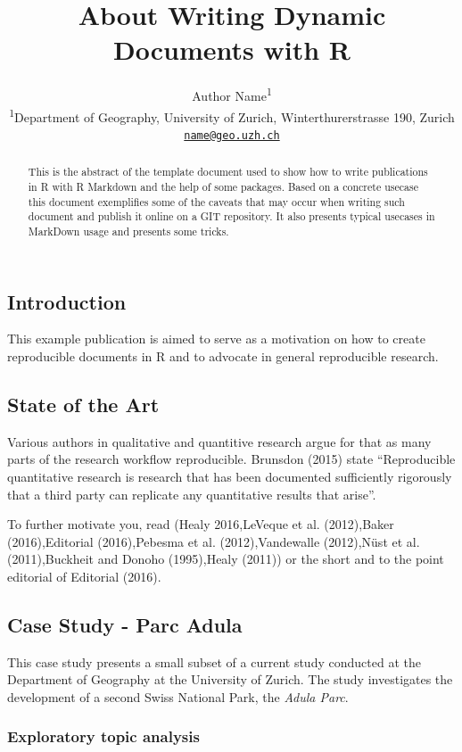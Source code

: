 \documentclass[]{article}
\title{About Writing Dynamic Documents with R}
\author{Author Name\textsuperscript{1} \\ \textsuperscript{1}Department of Geography, University of Zurich,
Winterthurerstrasse 190, Zurich \\ \href{mailto:name@geo.uzh.ch}{\nolinkurl{name@geo.uzh.ch}}}
\date{}
\begin{document}
\maketitle
\begin{abstract}
This is the abstract of the template document used to show how to write
publications in R with R Markdown and the help of some packages. Based
on a concrete usecase this document exemplifies some of the caveats that
may occur when writing such document and publish it online on a GIT
repository. It also presents typical usecases in MarkDown usage and
presents some tricks.
\end{abstract}

\subsection{Introduction}\label{introduction}

This example publication is aimed to serve as a motivation on how to
create reproducible documents in R and to advocate in general
reproducible research.

\subsection{State of the Art}\label{state-of-the-art}

Various authors in qualitative and quantitive research argue for that as
many parts of the research workflow reproducible. Brunsdon (2015) state
``Reproducible quantitative research is research that has been
documented sufficiently rigorously that a third party can replicate any
quantitative results that arise''.

To further motivate you, read (Healy 2016,LeVeque et al. (2012),Baker
(2016),Editorial (2016),Pebesma et al. (2012),Vandewalle (2012),Nüst et
al. (2011),Buckheit and Donoho (1995),Healy (2011)) or the short and to
the point editorial of Editorial (2016).

\subsection{Case Study - Parc Adula}\label{case-study---parc-adula}

This case study presents a small subset of a current study conducted at
the Department of Geography at the University of Zurich. The study
investigates the development of a second Swiss National Park, the
\emph{Adula Parc}.

\subsubsection{Exploratory topic
analysis}\label{exploratory-topic-analysis}
\end{document}

